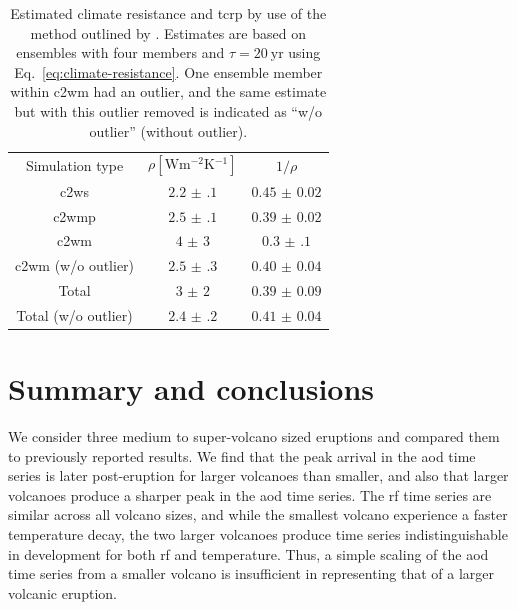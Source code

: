 \documentclass{ametsocV6.1}
\begin{document}
\begin{table}
  \centering

  \caption{Estimated climate resistance and \gls{tcrp} by use of the method outlined by
    \citet{merlis2014}. Estimates are based on ensembles with four members and \(\tau
    =\SI{20}{\mathrm{yr}}\) using Eq.~\ref{eq:climate-resistance}. One ensemble member
    within \gls{c2wm} had an outlier, and the same estimate but with this outlier removed is
    indicated as ``w/o outlier'' (without outlier).}\label{tab:trcp}%
  \begin{tabular}{ccc}
    Simulation type          & \(\rho [\si{\watt\metre^{-2}\kelvin^{-1}}]\) & \(1/\rho\)        \\
    \gls{c2ws}               & \(\num{2.2(1)}\)                             & \(\num{0.45(2)}\) \\
    \gls{c2wmp}              & \(\num{2.5(1)}\)                             & \(\num{0.39(2)}\) \\
    \gls{c2wm}               & \(\num{4(3)}\)                               & \(\num{0.3(1)}\)  \\
    \gls{c2wm} (w/o outlier) & \(\num{2.5(3)}\)                             & \(\num{0.40(4)}\) \\
    Total                    & \(\num{3(2)}\)                               & \(\num{0.39(9)}\) \\
    Total (w/o outlier)      & \(\num{2.4(2)}\)                             & \(\num{0.41(4)}\) \\
  \end{tabular}
\end{table}


\section{Summary and conclusions}\label{sec:conclusions}

We consider three medium to super-volcano sized eruptions and compared them to
previously reported results. We find that the peak arrival in the \gls{aod} time series
is later post-eruption for larger volcanoes than smaller, and also that larger volcanoes
produce a sharper peak in the \gls{aod} time series. The \gls{rf} time series are
similar across all volcano sizes, and while the smallest volcano experience a faster
temperature decay, the two larger volcanoes produce time series indistinguishable in
development for both \gls{rf} and temperature. Thus, a simple scaling of the \gls{aod}
time series from a smaller volcano is insufficient in representing that of a larger
volcanic eruption.
\end{document}
